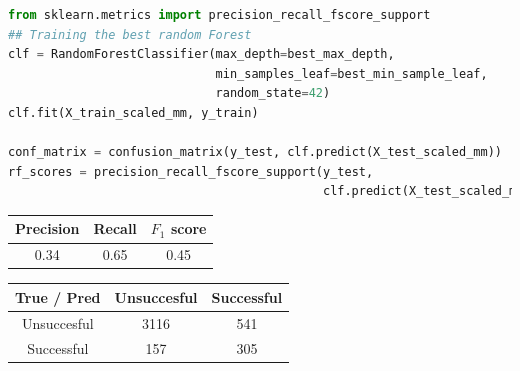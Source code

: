 \begin{lstlisting}[language=Python, caption= Deploying the Random forest with the best parameters]
from sklearn.metrics import precision_recall_fscore_support
## Training the best random Forest
clf = RandomForestClassifier(max_depth=best_max_depth,
                             min_samples_leaf=best_min_sample_leaf, 
                             random_state=42)
clf.fit(X_train_scaled_mm, y_train)

conf_matrix = confusion_matrix(y_test, clf.predict(X_test_scaled_mm))
rf_scores = precision_recall_fscore_support(y_test,
                                            clf.predict(X_test_scaled_mm))
\end{lstlisting}
\begin{center}
    \begin{tabular}{|c|c|c|}
        \hline
        Precision & Recall & \(F_1\) score \\
        \hline
        0.34 & 0.65 & 0.45 \\
        \hline
    \end{tabular}
    \quad     
    \begin{tabular}{|c|c|c|}
        \hline
         True / Pred & Unsuccesful & Successful \\
        \hline
        Unsuccesful & 3116 & 541 \\
        \hline
        Successful & 157 & 305\\
        \hline
    \end{tabular}
\end{center}

